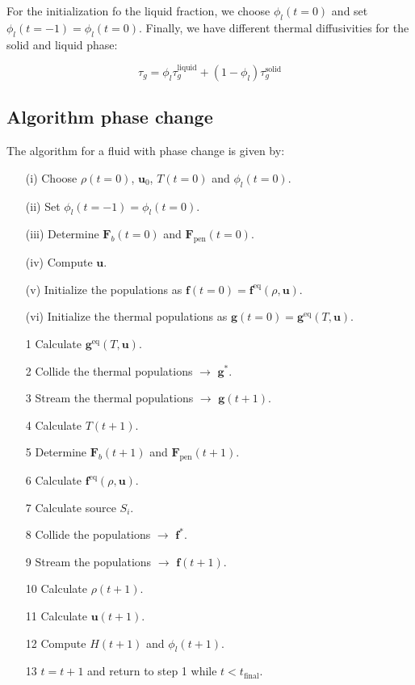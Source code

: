 For the initialization fo the liquid fraction, we choose $\phi_l(t=0)$ and set $\phi_l(t=-1) = \phi_l(t=0)$. Finally, we have different thermal diffusivities for the solid and liquid phase:

\begin{equation}
    \tau_g = \phi_l \tau_g^{\text{liquid}} + \left(1 - \phi_l\right)\tau_g^{\text{solid}}
\end{equation}

\subsection{Algorithm phase change}
The algorithm for a fluid with phase change is given by:

\begin{itemize}\label{it:Algorithm phase change}
    \item[(i)] Choose $\rho(t=0)$, $\bm{u}_0$, $T(t=0)$ and $\phi_l(t=0)$.
    \item[(ii)] Set $\phi_l(t=-1) = \phi_l(t=0)$. 
    \item[(iii)] Determine $\bm{F}_b(t=0)$ and $\bm{F}_{\text{pen}}(t=0)$.
    \item[(iv)] Compute $\bm{u}$. 
    \item[(v)] Initialize the populations as $\bm{f}(t=0) = \bm{f}^{\text{eq}}(\rho, \bm{u})$. 
    \item[(vi)] Initialize the thermal populations as $\bm{g}(t=0) = \bm{g}^{\text{eq}}(T, \bm{u})$. 
    \item[1] Calculate $\bm{g}^{\text{eq}}(T, \bm{u})$. 
    \item[2] Collide the thermal populations $\rightarrow$ $\bm{g}^{\ast}$.
    \item[3] Stream the thermal populations $\rightarrow$ $\bm{g}(t + 1)$.
    \item[4] Calculate $T(t+1)$.
    \item[5] Determine $\bm{F}_b(t+1)$ and $\bm{F}_{\text{pen}}(t+1)$. 
    \item[6] Calculate $\bm{f}^{\text{eq}}(\rho, \bm{u})$.
    \item[7] Calculate source $S_i$.
    \item[8] Collide the populations $\rightarrow$ $\bm{f}^{\ast}$.
    \item[9] Stream the populations $\rightarrow$ $\bm{f}(t + 1)$.
    \item[10] Calculate $\rho(t + 1)$.
    \item[11] Calculate $\bm{u}(t + 1)$.
    \item[12] Compute $H(t+1)$ and $\phi_l(t+1)$. 
    \item[13] $t = t + 1$ and return to step 1 while $t < t_{\text{final}}$.
\end{itemize}

